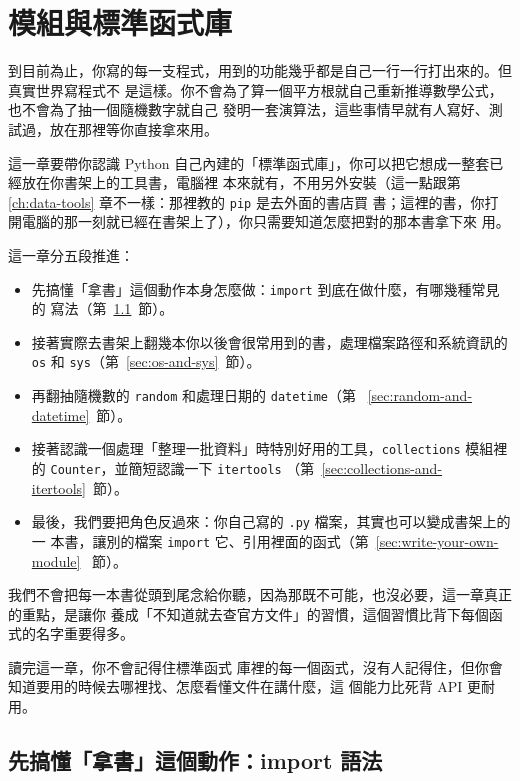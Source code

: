 \chapter{模組與標準函式庫}
\label{ch:modules}

到目前為止，你寫的每一支程式，用到的功能幾乎都是自己一行一行打出來的。但真實世界寫程式不
是這樣。你不會為了算一個平方根就自己重新推導數學公式，也不會為了抽一個隨機數字就自己
發明一套演算法，這些事情早就有人寫好、測試過，放在那裡等你直接拿來用。

這一章要帶你認識
Python 自己內建的「標準函式庫」，你可以把它想成一整套已經放在你書架上的工具書，電腦裡
本來就有，不用另外安裝（這一點跟第 \ref{ch:data-tools} 章不一樣：那裡教的 \texttt{pip} 是去外面的書店買
書；這裡的書，你打開電腦的那一刻就已經在書架上了），你只需要知道怎麼把對的那本書拿下來
用。

這一章分五段推進：

\begin{itemize}
\item 先搞懂「拿書」這個動作本身怎麼做：\texttt{import} 到底在做什麼，有哪幾種常見的
寫法（第~\ref{sec:import-syntax}~節）。
\item 接著實際去書架上翻幾本你以後會很常用到的書，處理檔案路徑和系統資訊的 \texttt{os}
和 \texttt{sys}（第~\ref{sec:os-and-sys}~節）。
\item 再翻抽隨機數的 \texttt{random} 和處理日期的 \texttt{datetime}（第~
\ref{sec:random-and-datetime}~節）。
\item 接著認識一個處理「整理一批資料」時特別好用的工具，\texttt{collections} 模組裡的
\texttt{Counter}，並簡短認識一下 \texttt{itertools}
（第~\ref{sec:collections-and-itertools}~節）。
\item 最後，我們要把角色反過來：你自己寫的 \texttt{.py} 檔案，其實也可以變成書架上的一
本書，讓別的檔案 \texttt{import} 它、引用裡面的函式（第~\ref{sec:write-your-own-module}
~節）。
\end{itemize}

我們不會把每一本書從頭到尾念給你聽，因為那既不可能，也沒必要，這一章真正的重點，是讓你
養成「不知道就去查官方文件」的習慣，這個習慣比背下每個函式的名字重要得多。

讀完這一章，你不會記得住標準函式
庫裡的每一個函式，沒有人記得住，但你會知道要用的時候去哪裡找、怎麼看懂文件在講什麼，這
個能力比死背 API 更耐用。

\section{先搞懂「拿書」這個動作：import 語法}
\label{sec:import-syntax}

